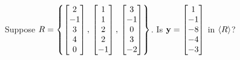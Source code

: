 \documentclass{ximera}
\author{Robert Beezer}
\begin{document}
\begin{exercise}
  Suppose $R=\left\{\begin{bmatrix}2\\-1\\3\\4\\0\end{bmatrix},\,\begin{bmatrix}1\\1\\2\\2\\-1\end{bmatrix},\,\begin{bmatrix}3\\-1\\0\\3\\-2\end{bmatrix}\right\}$.  Is $\mathbf{y}=\begin{bmatrix}1\\-1\\-8\\-4\\-3\end{bmatrix}$ in $\left\langle R\right\rangle$?

  \begin{multipleChoice}
  \end{multipleChoice}


\end{exercise}
\end{document}
